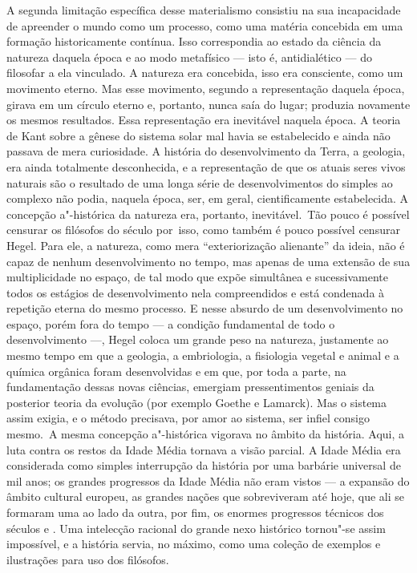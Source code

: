 A segunda limitação específica desse materialismo consistiu na sua
incapacidade de apreender o mundo como um processo, como uma matéria
concebida em uma formação historicamente contínua. Isso correspondia ao
estado da ciência da natureza daquela época e ao modo
metafísico --- isto é, antidialético --- do filosofar a ela vinculado. A natureza era
concebida, isso era consciente, como um movimento eterno. Mas esse
movimento, segundo a representação daquela época, girava em um círculo
eterno e, portanto, nunca saía do lugar; produzia novamente os
mesmos resultados. Essa representação era inevitável naquela época. A
teoria
de Kant sobre
a gênese do sistema solar mal havia se estabelecido e ainda não passava
de mera curiosidade. A história do desenvolvimento da Terra, a geologia,
era ainda totalmente desconhecida, e a representação de que os atuais seres
vivos naturais são o resultado de uma longa série de
desenvolvimentos do simples ao complexo não podia, naquela época, ser,
em geral, cientificamente estabelecida. A concepção a"-histórica
da natureza era, portanto, inevitável. 
 \textbar{}\,Tão pouco é possível censurar os filósofos do século  por\est\ isso,
como também é pouco possível censurar Hegel. Para ele, a natureza, como mera
``exteriorização alienante'' da ideia, não é capaz 
de nenhum desenvolvimento no tempo, mas apenas de uma extensão de sua
multiplicidade no espaço, de tal modo que expõe simultânea e
sucessivamente todos os estágios de desenvolvimento nela compreendidos e
está condenada à repetição eterna do mesmo processo. E nesse
absurdo de um desenvolvimento no espaço, porém fora do tempo --- a
condição fundamental de todo o desenvolvimento ---,
Hegel coloca
um grande peso na natureza, justamente ao mesmo tempo em que a geologia,
a embriologia, a fisiologia vegetal e animal e a química orgânica foram
desenvolvidas e em que, por toda a parte, na fundamentação dessas novas
ciências, emergiam pressentimentos geniais da posterior teoria da
evolução (por exemplo Goethe e Lamarck).
Mas o sistema assim exigia, e o método precisava, por amor ao sistema,
ser infiel consigo mesmo.\,\textbar{} A mesma concepção a"-histórica
vigorava no âmbito da história. Aqui, a luta contra os restos da Idade
Média tornava a visão parcial. A Idade Média era considerada como
simples interrupção da história por uma barbárie 
universal de mil anos; os grandes progressos da Idade Média não eram vistos --- a expansão
do âmbito cultural europeu, as grandes nações que sobreviveram até hoje,
que ali se formaram uma ao lado da outra, por fim, os enormes progressos
técnicos dos séculos  e . Uma
intelecção
racional do grande nexo histórico tornou"-se assim
impossível, e a história servia, no máximo, como uma coleção de exemplos
e ilustrações para uso dos filósofos.

